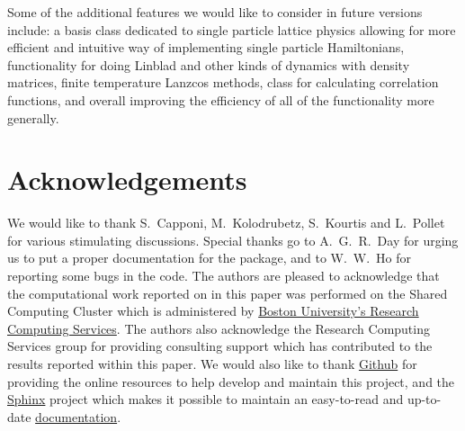\documentclass{SciPost}
\newcommand\0{\scalebox{-1}[1]{0}}
\begin{document}
Some of the additional features we would like to consider in future versions include: a basis class dedicated to single particle lattice physics allowing for more efficient and intuitive way of implementing single particle Hamiltonians, functionality for doing Linblad and other kinds of dynamics with density matrices, finite temperature Lanzcos methods, class for calculating correlation functions, and overall improving the efficiency of all of the functionality more generally. 
 

\section*{Acknowledgements}
We would like to thank S.~Capponi, M.~Kolodrubetz, S.~Kourtis and L.~Pollet for various stimulating discussions. Special thanks go to A.~G.~R.~Day for urging us to put a proper documentation for the package, and to W.~W.~Ho for reporting some bugs in the code. The authors are pleased to acknowledge that the computational work reported on in this paper was performed on the Shared Computing Cluster which is administered by \href{http://www.bu.edu/tech/support/research/}{Boston University's Research Computing Services}. The authors also acknowledge the Research Computing Services group for providing consulting support which has contributed to the results reported within this paper. We would also like to thank \href{https://github.com/}{Github} for providing the online resources to help develop and maintain this project, and the \href{http://www.sphinx-doc.org/en/stable/#}{Sphinx} project which makes it possible to maintain an easy-to-read and up-to-date \href{http://weinbe58.github.io/QuSpin/index.html}{documentation}. 

\end{document}
